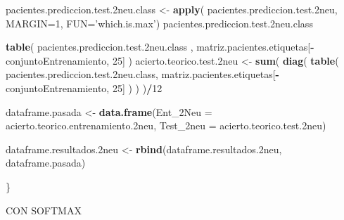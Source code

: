 \documentclass[]{article}
\newenvironment{Shaded}{\begin{snugshade}}{\end{snugshade}}
\newcommand{\KeywordTok}[1]{\textcolor[rgb]{0.13,0.29,0.53}{\textbf{#1}}}
\newcommand{\DataTypeTok}[1]{\textcolor[rgb]{0.13,0.29,0.53}{#1}}
\newcommand{\DecValTok}[1]{\textcolor[rgb]{0.00,0.00,0.81}{#1}}
\newcommand{\StringTok}[1]{\textcolor[rgb]{0.31,0.60,0.02}{#1}}
\newcommand{\OperatorTok}[1]{\textcolor[rgb]{0.81,0.36,0.00}{\textbf{#1}}}
\newcommand{\NormalTok}[1]{#1}
\begin{document}
\begin{Shaded}
\begin{Highlighting}[]
\NormalTok{  pacientes.prediccion.test.2neu.class <-}\StringTok{ }\KeywordTok{apply}\NormalTok{( pacientes.prediccion.test.2neu, }\DataTypeTok{MARGIN=}\DecValTok{1}\NormalTok{, }\DataTypeTok{FUN=}\StringTok{'which.is.max'}\NormalTok{)}
\NormalTok{  pacientes.prediccion.test.2neu.class}
  
  \KeywordTok{table}\NormalTok{( pacientes.prediccion.test.2neu.class , matriz.pacientes.etiquetas[}\OperatorTok{-}\NormalTok{conjuntoEntrenamiento, }\DecValTok{25}\NormalTok{] )}
\NormalTok{  acierto.teorico.test.2neu <-}\StringTok{ }\KeywordTok{sum}\NormalTok{( }\KeywordTok{diag}\NormalTok{( }\KeywordTok{table}\NormalTok{( pacientes.prediccion.test.2neu.class, matriz.pacientes.etiquetas[}\OperatorTok{-}\NormalTok{conjuntoEntrenamiento, }\DecValTok{25}\NormalTok{] ) ) )}\OperatorTok{/}\DecValTok{12}
  
  
\NormalTok{  dataframe.pasada <-}\StringTok{ }\KeywordTok{data.frame}\NormalTok{(}\DataTypeTok{Ent_2Neu =}\NormalTok{ acierto.teorico.entrenamiento.2neu,}
                                 \DataTypeTok{Test_2neu =}\NormalTok{ acierto.teorico.test.2neu)}
  
\NormalTok{  dataframe.resultados.2neu <-}\StringTok{ }\KeywordTok{rbind}\NormalTok{(dataframe.resultados.2neu, dataframe.pasada)}
  
  
\NormalTok{\}}
\end{Highlighting}
\end{Shaded}

CON SOFTMAX
\end{document}
